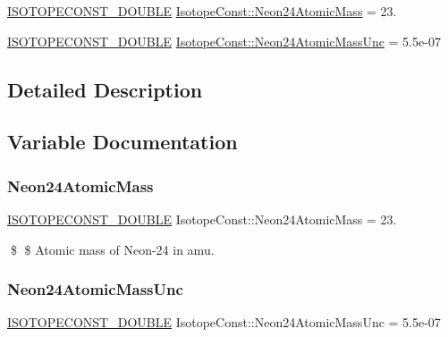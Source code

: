 \begin{DoxyCompactItemize}
\item 
\mbox{\hyperlink{group___isotope_const-_macros_ga8f45a7272ce02c0b4c65c44636ed719a}{I\+S\+O\+T\+O\+P\+E\+C\+O\+N\+S\+T\+\_\+\+D\+O\+U\+B\+LE}} \mbox{\hyperlink{group___isotope_const-_neon-_ne24_ga241b2d3404a57794dec0d5380f6479eb}{Isotope\+Const\+::\+Neon24\+Atomic\+Mass}} = 23.
\item 
\mbox{\hyperlink{group___isotope_const-_macros_ga8f45a7272ce02c0b4c65c44636ed719a}{I\+S\+O\+T\+O\+P\+E\+C\+O\+N\+S\+T\+\_\+\+D\+O\+U\+B\+LE}} \mbox{\hyperlink{group___isotope_const-_neon-_ne24_gab31ec608f9171e9cc0fc745c49b5e89f}{Isotope\+Const\+::\+Neon24\+Atomic\+Mass\+Unc}} = 5.\+5e-\/07
\end{DoxyCompactItemize}


\subsection{Detailed Description}


\subsection{Variable Documentation}
\mbox{\label{group___isotope_const-_neon-_ne24_ga241b2d3404a57794dec0d5380f6479eb}} 
\subsubsection{\texorpdfstring{Neon24\+Atomic\+Mass}{Neon24AtomicMass}}
{\footnotesize\ttfamily \mbox{\hyperlink{group___isotope_const-_macros_ga8f45a7272ce02c0b4c65c44636ed719a}{I\+S\+O\+T\+O\+P\+E\+C\+O\+N\+S\+T\+\_\+\+D\+O\+U\+B\+LE}} Isotope\+Const\+::\+Neon24\+Atomic\+Mass = 23.}

\$ \$ Atomic mass of Neon-\/24 in amu. \mbox{\label{group___isotope_const-_neon-_ne24_gab31ec608f9171e9cc0fc745c49b5e89f}} 
\subsubsection{\texorpdfstring{Neon24\+Atomic\+Mass\+Unc}{Neon24AtomicMassUnc}}
{\footnotesize\ttfamily \mbox{\hyperlink{group___isotope_const-_macros_ga8f45a7272ce02c0b4c65c44636ed719a}{I\+S\+O\+T\+O\+P\+E\+C\+O\+N\+S\+T\+\_\+\+D\+O\+U\+B\+LE}} Isotope\+Const\+::\+Neon24\+Atomic\+Mass\+Unc = 5.\+5e-\/07}

